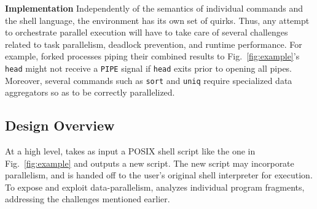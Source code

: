 \documentclass[letterpaper,twocolumn,10pt]{article}
\newcommand{\eg}{{\em e.g.}, }
\newcommand{\heading}[1]{\vspace{4pt}\noindent\textbf{#1}\enspace}
\newcommand{\ttt}[1]{\texttt{#1}}
\begin{document}
\heading{Implementation} %
Independently of the semantics of individual commands and the shell language, the \unix environment has its own set of quirks.
Thus, any attempt to orchestrate parallel execution will have to take care of several challenges related to task parallelism, deadlock prevention, and runtime performance.
For example, forked processes piping their combined results to Fig.~\ref{fig:example}'s \ttt{head} might not receive a \ttt{PIPE} signal if \ttt{head} exits prior to opening all pipes.
Moreover, several commands such as \ttt{sort} and \ttt{uniq} require specialized data aggregators so as to be correctly parallelized.


\subsection{\sys Design Overview}
\label{bg:overview}

At a high level, \sys takes as input a POSIX shell script like the one in Fig.~\ref{fig:example} and outputs a new script.
The new script may incorporate parallelism, and is handed off to the user's original shell interpreter %
  for execution.
To expose and exploit data-parallelism, %
\sys analyzes individual program fragments, addressing the challenges mentioned earlier.
\end{document}
